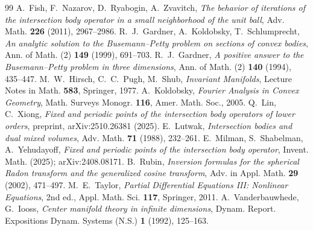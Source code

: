 \documentclass[10pt,a4paper]{amsart}
\begin{document}
\begin{thebibliography}{99}
 A.~Fish, F.~Nazarov, D.~Ryabogin, A.~Zvavitch, \emph{The behavior of iterations of the intersection body operator in a small neighborhood of the unit ball}, Adv. Math. \textbf{226} (2011), 2967--2986.
 R.~J.~Gardner, A.~Koldobsky, T.~Schlumprecht, \emph{An analytic solution to the Busemann--Petty problem on sections of convex bodies}, Ann. of Math. (2) \textbf{149} (1999), 691--703.
 R.~J.~Gardner, \emph{A positive answer to the Busemann--Petty problem in three dimensions}, Ann. of Math. (2) \textbf{140} (1994), 435--447.
 M.~W.~Hirsch, C.~C.~Pugh, M.~Shub, \emph{Invariant Manifolds}, Lecture Notes in Math. \textbf{583}, Springer, 1977.
 A.~Koldobsky, \emph{Fourier Analysis in Convex Geometry}, Math. Surveys Monogr. \textbf{116}, Amer. Math. Soc., 2005.
 Q.~Lin, C.~Xiong, \emph{Fixed and periodic points of the intersection body operators of lower orders}, preprint, arXiv:2510.26381 (2025).
 E.~Lutwak, \emph{Intersection bodies and dual mixed volumes}, Adv. Math. \textbf{71} (1988), 232--261.
 E.~Milman, S.~Shabelman, A.~Yehudayoff, \emph{Fixed and periodic points of the intersection body operator}, Invent. Math. (2025); arXiv:2408.08171.
 B.~Rubin, \emph{Inversion formulas for the spherical Radon transform and the generalized cosine transform}, Adv. in Appl. Math. \textbf{29} (2002), 471--497.
 M.~E.~Taylor, \emph{Partial Differential Equations III: Nonlinear Equations}, 2nd ed., Appl. Math. Sci. \textbf{117}, Springer, 2011.
 A.~Vanderbauwhede, G.~Iooss, \emph{Center manifold theory in infinite dimensions}, Dynam. Report. Expositions Dynam. Systems (N.S.) \textbf{1} (1992), 125--163.
\end{thebibliography}
\end{document}
